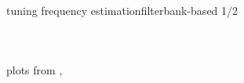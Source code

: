 \begin{frame}{tuning frequency estimation}{filterbank-based 1/2}
\begin{columns}
\begin{enumerate}
            \end{enumerate}
        \end{columns}
        \begin{flushright}
            plots from ,
        \end{flushright}
	\end{frame}
